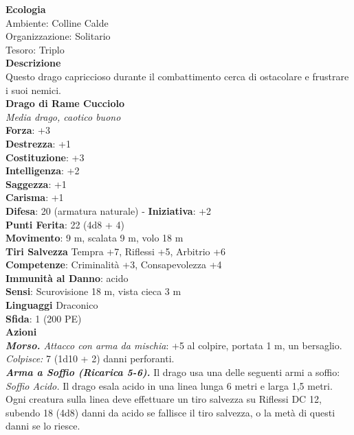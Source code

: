 \begin{multicols}{2}
\textbf{Ecologia}\\
Ambiente: Colline Calde\\
Organizzazione: Solitario\\
Tesoro: Triplo\\
\textbf{Descrizione}\\
Questo drago capriccioso durante il combattimento cerca di ostacolare e frustrare i suoi nemici.\\


\medskip\textbf{Drago di Rame Cucciolo}\\
\emph{Media drago, caotico buono}\\
\textbf{Forza}: +3\\
\textbf{Destrezza}: +1\\
\textbf{Costituzione}: +3\\
\textbf{Intelligenza}: +2\\
\textbf{Saggezza}: +1\\
\textbf{Carisma}: +1\\
\textbf{Difesa}: 20 (armatura naturale) - \textbf{Iniziativa}: +2\\
\textbf{Punti Ferita}: 22 (4d8 + 4)\\
\textbf{Movimento}: 9 m, scalata 9 m, volo 18 m\\
\textbf{Tiri Salvezza} Tempra +7, Riflessi +5, Arbitrio +6\\
\textbf{Competenze}: Criminalità +3, Consapevolezza +4\\
\textbf{Immunità al Danno}: acido\\
\textbf{Sensi}: Scurovisione 18 m, vista cieca 3 m\\
\textbf{Linguaggi} Draconico\\
\textbf{Sfida}: 1 (200 PE)\smallskip\\
\smallskip\textbf{Azioni}\\
\emph{\textbf{Morso.} Attacco con arma da mischia}: +5 al colpire, portata 1 m, un bersaglio.\\
\emph{Colpisce:} 7 (1d10 + 2) danni perforanti.\\
\emph{\textbf{Arma a Soffio (Ricarica 5-6).}} Il drago usa una delle seguenti armi a soffio:\\
\emph{Soffio Acido.} Il drago esala acido in una linea lunga 6 metri e larga 1,5 metri. Ogni creatura sulla linea deve effettuare un tiro salvezza su Riflessi DC  12, subendo 18 (4d8) danni da acido se fallisce il tiro salvezza, o la metà di questi danni se lo riesce.\\

\end{multicols}

